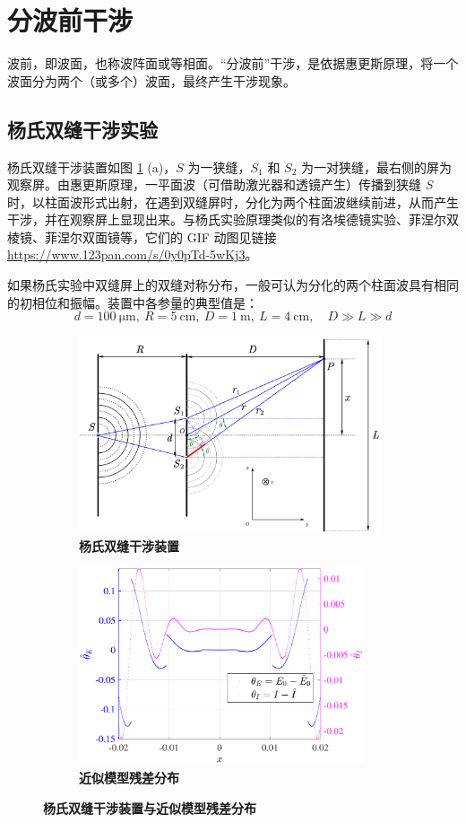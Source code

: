 \documentclass[UTF8]{report}
\theoremstyle{MyLineTheoremStyle} %
\theoremstyle{MyBlockTheoremStyle} %
\theoremstyle{MySubsubsectionStyle} %
\begin{document}
\section{分波前干涉}

波前，即波面，也称波阵面或等相面。“分波前”干涉，是依据惠更斯原理，将一个波面分为两个（或多个）波面，最终产生干涉现象。

\subsection{杨氏双缝干涉实验}

杨氏双缝干涉装置如图 \ref{杨氏双缝干涉装置} (a)，$S$ 为一狭缝，$S_1$ 和 $S_2$ 为一对狭缝，最右侧的屏为观察屏。由惠更斯原理，一平面波（可借助激光器和透镜产生）传播到狭缝 $S$ 时，以柱面波形式出射，在遇到双缝屏时，分化为两个柱面波继续前进，从而产生干涉，并在观察屏上显现出来。与杨氏实验原理类似的有洛埃德镜实验、菲涅尔双棱镜、菲涅尔双面镜等，它们的 GIF 动图见链接 \href{https://www.123pan.com/s/0y0pTd-5wKj3}{https://www.123pan.com/s/0y0pTd-5wKj3}。

如果杨氏实验中双缝屏上的双缝对称分布，一般可认为分化的两个柱面波具有相同的初相位和振幅。装置中各参量的典型值是：
\begin{equation}
d = 100 \ \mathrm{\mu m},\  R = 5\ \mathrm{cm},\ D = 1\ \mathrm{m},\ L = 4 \ \mathrm{cm},\quad D \gg L \gg d
\end{equation}

\begin{figure}[H]\centering
    \begin{subfigure}[t]{0.52\columnwidth}\centering
        \includegraphics[height=165pt]{assets/3/杨双.pdf}
        \caption{\bfseries 杨氏双缝干涉装置 }
    \end{subfigure}\begin{subfigure}[t]{0.48\columnwidth}\centering
        \includegraphics[height=165pt]{assets/3/杨残差.pdf}
        \caption{\bfseries 近似模型残差分布 }
    \end{subfigure}
    \caption{\bfseries 杨氏双缝干涉装置与近似模型残差分布 }\label{杨氏双缝干涉装置}
\end{figure}
\end{document}

